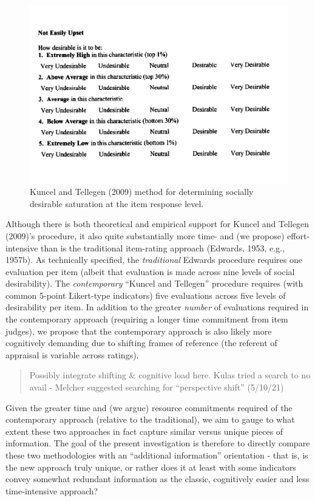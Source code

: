 \documentclass[
  english,
  ,jou]{apa6}
\begin{document}
\begin{figure}
\centering
\includegraphics{KuncelTellegen_files/figure-latex/Figure1-1.pdf}
\caption{\label{fig:Figure1}Kuncel and Tellegen (2009) method for determining socially desirable saturation at the item response level.}
\end{figure}

Although there is both theoretical and empirical support for Kuncel and Tellegen (2009)'s procedure, it also quite substantially more time- and (we propose) effort-intensive than is the traditional item-rating approach (Edwards, 1953, e.g., 1957b). As technically specified, the \emph{traditional} Edwards procedure requires one evaluation per item (albeit that evaluation is made across nine levels of social desirability). The \emph{contemporary} ``Kuncel and Tellegen'' procedure requires (with common 5-point Likert-type indicators) five evaluations across five levels of desirability per item. In addition to the greater \emph{number} of evaluations required in the contemporary approach (requiring a longer time commitment from item judges), we propose that the contemporary approach is also likely more cognitively demanding due to shifting frames of reference (the referent of appraisal is variable across ratings).

\begin{quote}
Possibly integrate shifting \& cognitive load here. Kulas tried a search to no avail - Melcher suggested searching for ``perspective shift'' (5/10/21)
\end{quote}

Given the greater time and (we argue) resource commitments required of the contemporary approach (relative to the traditional), we aim to gauge to what extent these two approaches in fact capture similar versus unique pieces of information. The goal of the present investigation is therefore to directly compare these two methodologies with an ``additional information'' orientation - that is, is the new approach truly unique, or rather does it at least with some indicators convey somewhat redundant information as the classic, cognitively easier and less time-intensive approach?
\end{document}
